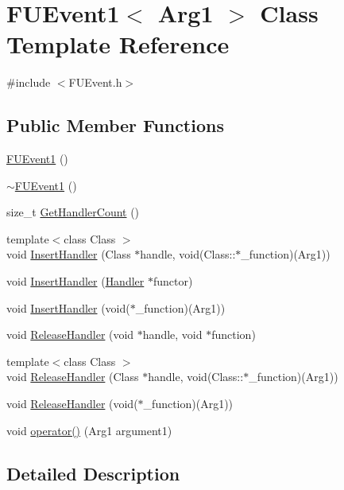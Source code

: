 \hypertarget{classFUEvent1}{
\section{FUEvent1$<$ Arg1 $>$ Class Template Reference}
\label{classFUEvent1}
}


{\ttfamily \#include $<$FUEvent.h$>$}

\subsection*{Public Member Functions}
\begin{DoxyCompactItemize}
\item 
\hyperlink{classFUEvent1_aeb2857b76a289959fc00e1703f78013d}{FUEvent1} ()
\item 
\hyperlink{classFUEvent1_a468c6dc59c55f8fec158918570c6a63d}{$\sim$FUEvent1} ()
\item 
size\_\-t \hyperlink{classFUEvent1_a1d7a397abec6f4107819c7e51446a834}{GetHandlerCount} ()
\item 
{\footnotesize template$<$class Class $>$ }\\void \hyperlink{classFUEvent1_aae1bd5925c353f9e5b04d2af09041f57}{InsertHandler} (Class $\ast$handle, void(Class::$\ast$\_\-function)(Arg1))
\item 
void \hyperlink{classFUEvent1_a4b909e5a3c1d81fe60264d1fb29fe9fa}{InsertHandler} (\hyperlink{classIFunctor1}{Handler} $\ast$functor)
\item 
void \hyperlink{classFUEvent1_a2be03967857daeafbc053b4104b06bbb}{InsertHandler} (void($\ast$\_\-function)(Arg1))
\item 
void \hyperlink{classFUEvent1_afb98dd5422f51541b03b744c0440f156}{ReleaseHandler} (void $\ast$handle, void $\ast$function)
\item 
{\footnotesize template$<$class Class $>$ }\\void \hyperlink{classFUEvent1_a5796ad84ec938d63a4d4211b4007ae52}{ReleaseHandler} (Class $\ast$handle, void(Class::$\ast$\_\-function)(Arg1))
\item 
void \hyperlink{classFUEvent1_a5083879b0f594292f83b438be55e50a9}{ReleaseHandler} (void($\ast$\_\-function)(Arg1))
\item 
void \hyperlink{classFUEvent1_ad3fa78f0350b34361cf65d65fd75dece}{operator()} (Arg1 argument1)
\end{DoxyCompactItemize}


\subsection{Detailed Description}
